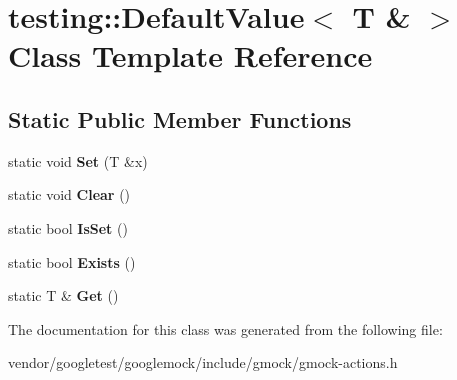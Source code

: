 \hypertarget{classtesting_1_1DefaultValue_3_01T_01_6_01_4}{}\section{testing\+:\+:Default\+Value$<$ T \& $>$ Class Template Reference}
\label{classtesting_1_1DefaultValue_3_01T_01_6_01_4}
\subsection*{Static Public Member Functions}
\begin{DoxyCompactItemize}
\item 
static void {\bfseries Set} (T \&x)\hypertarget{classtesting_1_1DefaultValue_3_01T_01_6_01_4_a9863abf3d311ce5007d7e57dfce2f252}{}\label{classtesting_1_1DefaultValue_3_01T_01_6_01_4_a9863abf3d311ce5007d7e57dfce2f252}

\item 
static void {\bfseries Clear} ()\hypertarget{classtesting_1_1DefaultValue_3_01T_01_6_01_4_a3c8f9f81e591370f9b33798f58ca1a10}{}\label{classtesting_1_1DefaultValue_3_01T_01_6_01_4_a3c8f9f81e591370f9b33798f58ca1a10}

\item 
static bool {\bfseries Is\+Set} ()\hypertarget{classtesting_1_1DefaultValue_3_01T_01_6_01_4_a3e61547c2f0141cc8004385f3a9c817d}{}\label{classtesting_1_1DefaultValue_3_01T_01_6_01_4_a3e61547c2f0141cc8004385f3a9c817d}

\item 
static bool {\bfseries Exists} ()\hypertarget{classtesting_1_1DefaultValue_3_01T_01_6_01_4_a38420499e17d2fb4146ae6c4265f0d55}{}\label{classtesting_1_1DefaultValue_3_01T_01_6_01_4_a38420499e17d2fb4146ae6c4265f0d55}

\item 
static T \& {\bfseries Get} ()\hypertarget{classtesting_1_1DefaultValue_3_01T_01_6_01_4_a1310448dd8c171aecfcbf7c8df5de7bd}{}\label{classtesting_1_1DefaultValue_3_01T_01_6_01_4_a1310448dd8c171aecfcbf7c8df5de7bd}

\end{DoxyCompactItemize}


The documentation for this class was generated from the following file\+:\begin{DoxyCompactItemize}
\item 
vendor/googletest/googlemock/include/gmock/gmock-\/actions.\+h\end{DoxyCompactItemize}
